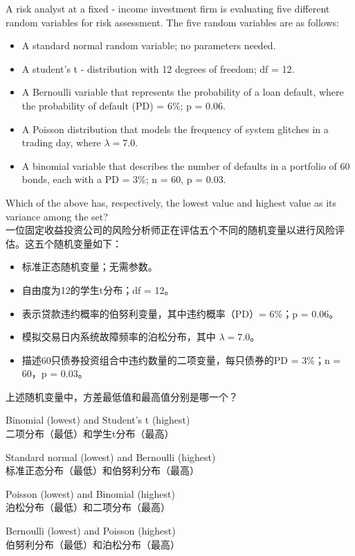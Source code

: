 \documentclass{article}
\newcounter{question} %
\begin{document}
    \begin{question}
        A risk analyst at a fixed - income investment firm is evaluating five different random variables for risk assessment. The five random variables are as follows:
        \begin{itemize}
        \item A standard normal random variable; no parameters needed.
        \item A student's t - distribution with 12 degrees of freedom; df = 12.
        \item A Bernoulli variable that represents the probability of a loan default, where the probability of default (PD) = 6\%; p = 0.06.
        \item A Poisson distribution that models the frequency of system glitches in a trading day, where \(\lambda=7.0\).
        \item A binomial variable that describes the number of defaults in a portfolio of 60 bonds, each with a PD = 3\%; n = 60, p = 0.03.
        \end{itemize}
        Which of the above has, respectively, the lowest value and highest value as its variance among the set?\\
        一位固定收益投资公司的风险分析师正在评估五个不同的随机变量以进行风险评估。这五个随机变量如下：
        \begin{itemize}
        \item 标准正态随机变量；无需参数。
        \item 自由度为12的学生t分布；df = 12。
        \item 表示贷款违约概率的伯努利变量，其中违约概率（PD）= 6\%；p = 0.06。
        \item 模拟交易日内系统故障频率的泊松分布，其中 \(\lambda=7.0\)。
        \item 描述60只债券投资组合中违约数量的二项变量，每只债券的PD = 3\%；n = 60，p = 0.03。
        \end{itemize}
        上述随机变量中，方差最低值和最高值分别是哪一个？\\
        \end{question}
        
        \begin{choices}
            \item Binomial (lowest) and Student's t (highest)\\
            二项分布（最低）和学生t分布（最高）
            \item Standard normal (lowest) and Bernoulli (highest)\\
            标准正态分布（最低）和伯努利分布（最高）
            \item Poisson (lowest) and Binomial (highest)\\
            泊松分布（最低）和二项分布（最高）
            \item Bernoulli (lowest) and Poisson (highest)\\
            伯努利分布（最低）和泊松分布（最高）
        \end{choices}
        
\end{document}

